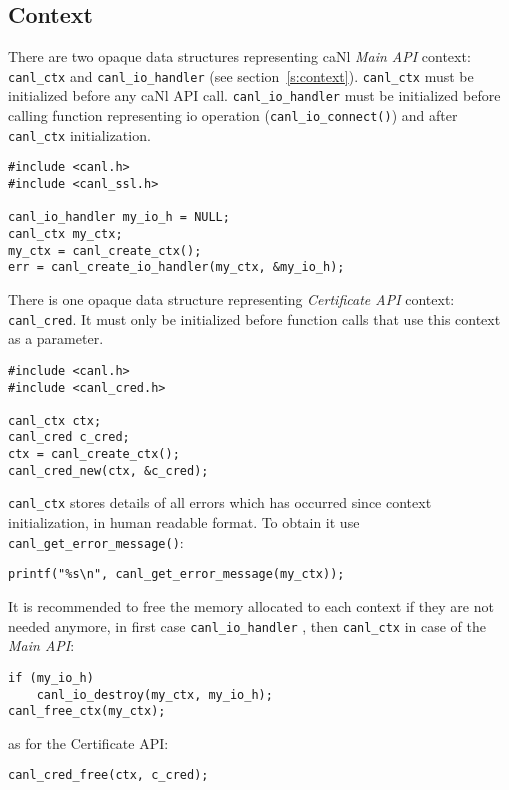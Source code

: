 \subsection{Context}
\label{s:canl_ctx}
%
There are two opaque data structures representing 
caNl \textit{Main API} context: {\tt canl\_ctx} and
 {\tt canl\_io\_handler} (see section~\ref{s:context}).
{\tt canl\_ctx} must be initialized before any caNl API call.
{\tt canl\_io\_handler} must be initialized before calling function
representing io operation (\eg \verb'canl_io_connect()') and after
{\tt canl\_ctx} initialization. 
\begin{lstlisting}
#include <canl.h>
#include <canl_ssl.h>

canl_io_handler my_io_h = NULL;
canl_ctx my_ctx;
my_ctx = canl_create_ctx();
err = canl_create_io_handler(my_ctx, &my_io_h);
\end{lstlisting}
There is one opaque data structure representing \CANL 
\textit{Certificate API} context: {\tt canl\_cred}.
It must only be initialized before function calls
that use this context as a parameter.
\begin{lstlisting}
#include <canl.h>
#include <canl_cred.h>

canl_ctx ctx;
canl_cred c_cred;
ctx = canl_create_ctx();
canl_cred_new(ctx, &c_cred);
\end{lstlisting}
%
{\tt canl\_ctx} stores details of all errors which has occurred since 
context initialization, in human readable format. To obtain it use 
\verb'canl_get_error_message()':
\begin{lstlisting}
printf("%s\n", canl_get_error_message(my_ctx));
\end{lstlisting}

%
It is recommended to free the memory allocated to each 
context if they are not needed anymore, in first case {\tt canl\_io\_handler}
, then {\tt canl\_ctx} in case of the \textit{Main API}:
\begin{lstlisting}
if (my_io_h)
	canl_io_destroy(my_ctx, my_io_h);
canl_free_ctx(my_ctx);
\end{lstlisting}
as for the Certificate API:
\begin{lstlisting}
canl_cred_free(ctx, c_cred);
\end{lstlisting}

